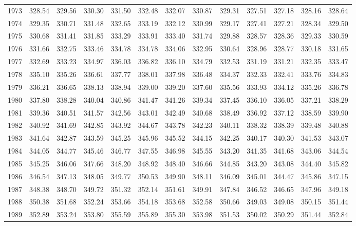 \documentclass[11pt, a4paper]{article} %
\begin{document}
\begin{table}[ht]
{\begin{tabular}{rrrrrrrrrrrrr}
  1973 & 328.54 & 329.56 & 330.30 & 331.50 & 332.48 & 332.07 & 330.87 & 329.31 & 327.51 & 327.18 & 328.16 & 328.64 \\ 
  1974 & 329.35 & 330.71 & 331.48 & 332.65 & 333.19 & 332.12 & 330.99 & 329.17 & 327.41 & 327.21 & 328.34 & 329.50 \\ 
  1975 & 330.68 & 331.41 & 331.85 & 333.29 & 333.91 & 333.40 & 331.74 & 329.88 & 328.57 & 328.36 & 329.33 & 330.59 \\ 
  1976 & 331.66 & 332.75 & 333.46 & 334.78 & 334.78 & 334.06 & 332.95 & 330.64 & 328.96 & 328.77 & 330.18 & 331.65 \\ 
  1977 & 332.69 & 333.23 & 334.97 & 336.03 & 336.82 & 336.10 & 334.79 & 332.53 & 331.19 & 331.21 & 332.35 & 333.47 \\ 
  1978 & 335.10 & 335.26 & 336.61 & 337.77 & 338.01 & 337.98 & 336.48 & 334.37 & 332.33 & 332.41 & 333.76 & 334.83 \\ 
  1979 & 336.21 & 336.65 & 338.13 & 338.94 & 339.00 & 339.20 & 337.60 & 335.56 & 333.93 & 334.12 & 335.26 & 336.78 \\ 
  1980 & 337.80 & 338.28 & 340.04 & 340.86 & 341.47 & 341.26 & 339.34 & 337.45 & 336.10 & 336.05 & 337.21 & 338.29 \\ 
  1981 & 339.36 & 340.51 & 341.57 & 342.56 & 343.01 & 342.49 & 340.68 & 338.49 & 336.92 & 337.12 & 338.59 & 339.90 \\ 
  1982 & 340.92 & 341.69 & 342.85 & 343.92 & 344.67 & 343.78 & 342.23 & 340.11 & 338.32 & 338.39 & 339.48 & 340.88 \\ 
  1983 & 341.64 & 342.87 & 343.59 & 345.25 & 345.96 & 345.52 & 344.15 & 342.25 & 340.17 & 340.30 & 341.53 & 343.07 \\ 
  1984 & 344.05 & 344.77 & 345.46 & 346.77 & 347.55 & 346.98 & 345.55 & 343.20 & 341.35 & 341.68 & 343.06 & 344.54 \\ 
  1985 & 345.25 & 346.06 & 347.66 & 348.20 & 348.92 & 348.40 & 346.66 & 344.85 & 343.20 & 343.08 & 344.40 & 345.82 \\ 
  1986 & 346.54 & 347.13 & 348.05 & 349.77 & 350.53 & 349.90 & 348.11 & 346.09 & 345.01 & 344.47 & 345.86 & 347.15 \\ 
  1987 & 348.38 & 348.70 & 349.72 & 351.32 & 352.14 & 351.61 & 349.91 & 347.84 & 346.52 & 346.65 & 347.96 & 349.18 \\ 
  1988 & 350.38 & 351.68 & 352.24 & 353.66 & 354.18 & 353.68 & 352.58 & 350.66 & 349.03 & 349.08 & 350.15 & 351.44 \\ 
  1989 & 352.89 & 353.24 & 353.80 & 355.59 & 355.89 & 355.30 & 353.98 & 351.53 & 350.02 & 350.29 & 351.44 & 352.84 \\ 

\end{tabular}}
\end{table}
\end{document}
